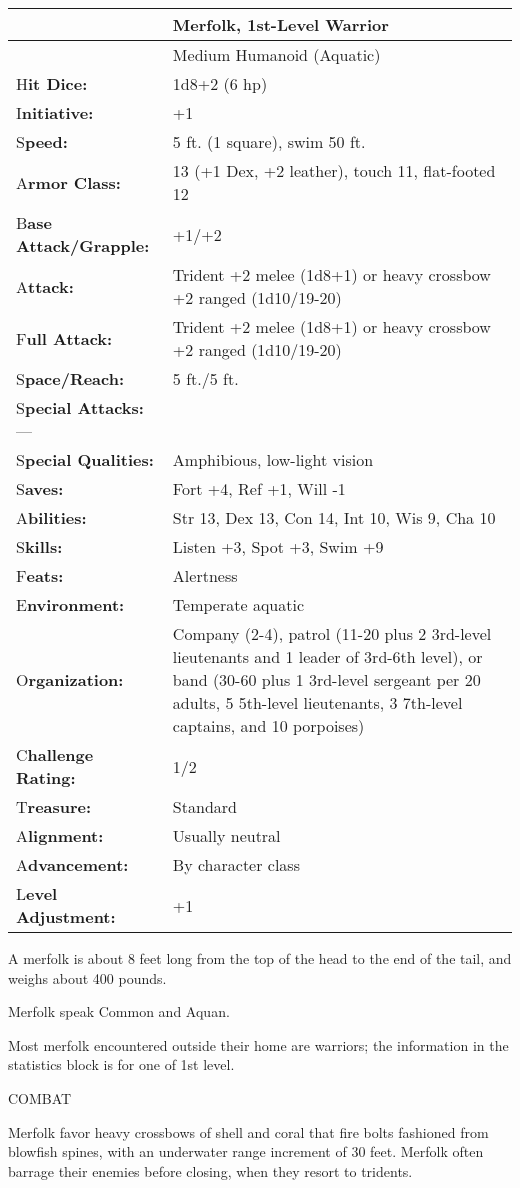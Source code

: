 \documentclass{article}
\begin{document}
\begin{tabular}{|>{\raggedright}p{91pt}|>{\raggedright}p{216pt}|}
\hline
  & Merfolk, 1st-Level Warrior\tabularnewline
\hline
  & Medium Humanoid (Aquatic)\tabularnewline
\hline
H\textbf{it Dice:} & 1d8+2 (6 hp)\tabularnewline
\hline
I\textbf{nitiative:} & +1\tabularnewline
\hline
S\textbf{peed:} & 5 ft. (1 square), swim 50 ft.\tabularnewline
\hline
A\textbf{rmor Class:} & 13 (+1 Dex, +2 leather), touch 11, flat-footed 12\tabularnewline
\hline
B\textbf{ase Attack/Grapple:} & +1/+2\tabularnewline
\hline
A\textbf{ttack:} & Trident +2 melee (1d8+1) or heavy crossbow +2 ranged (1d10/19-20)\tabularnewline
\hline
F\textbf{ull Attack:} & Trident +2 melee (1d8+1) or heavy crossbow +2 ranged (1d10/19-20)\tabularnewline
\hline
S\textbf{pace/Reach:} & 5 ft./5 ft.\tabularnewline
\hline
S\textbf{pecial Attacks:}--- & \tabularnewline
\hline
S\textbf{pecial Qualities:} & Amphibious, low-light vision\tabularnewline
\hline
S\textbf{aves:} & Fort +4, Ref +1, Will -1\tabularnewline
\hline
A\textbf{bilities:} & Str 13, Dex 13, Con 14, Int 10, Wis 9, Cha 10\tabularnewline
\hline
S\textbf{kills:} & Listen +3, Spot +3, Swim +9\tabularnewline
\hline
F\textbf{eats:} & Alertness\tabularnewline
\hline
E\textbf{nvironment:} & Temperate aquatic\tabularnewline
\hline
O\textbf{rganization:} & Company (2-4), patrol (11-20 plus 2 3rd-level lieutenants 
and 1 leader of 3rd-6th level), or band (30-60 plus 1 3rd-level sergeant per 20 
adults, 5 5th-level lieutenants, 3 7th-level captains, and 10 porpoises)\tabularnewline
\hline
C\textbf{hallenge Rating:} & 1/2\tabularnewline
\hline
T\textbf{reasure:} & Standard\tabularnewline
\hline
A\textbf{lignment:} & Usually neutral\tabularnewline
\hline
A\textbf{dvancement:} & By character class\tabularnewline
\hline
L\textbf{evel Adjustment:} & +1\tabularnewline
\hline
\end{tabular}

A merfolk is about 8 feet long from the top of the head to the end of the tail, 
and weighs about 400 pounds.

Merfolk speak Common and Aquan.

Most merfolk encountered outside their home are warriors; the information in the 
statistics block is for one of 1st level.

COMBAT

Merfolk favor heavy crossbows of shell and coral that fire bolts fashioned from 
blowfish spines, with an underwater range increment of 30 feet. Merfolk often barrage 
their enemies before closing, when they resort to tridents.
\end{document}
